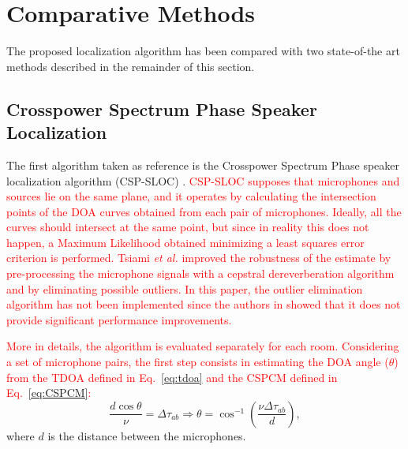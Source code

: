 \documentclass[review]{elsarticle}
\let\originaleqref=\eqref
\renewcommand{\eqref}{Eq.~\originaleqref}
\begin{document}
\section{Comparative Methods}
\label{sec:comp_meth}
The proposed localization algorithm has been compared with two state-of-the art methods described in the remainder of this section.

\subsection{Crosspower Spectrum Phase Speaker Localization}\label{sec:soa_met}
The first algorithm taken as reference is the Crosspower Spectrum Phase speaker localization algorithm (CSP-SLOC) \cite{tsiami2014experiments}. \textcolor{red}{CSP-SLOC supposes that microphones and sources lie on the same plane, and it operates by calculating the intersection points of the DOA curves obtained from each pair of microphones. Ideally, all the curves should intersect at the same point, but since in reality this does not happen, a Maximum Likelihood obtained minimizing a least squares error criterion is performed. Tsiami \textit{et al.} \cite{tsiami2014experiments} improved the robustness of the estimate by pre-processing the microphone signals with a cepstral dereverberation algorithm  and by eliminating possible outliers. In this paper, the outlier elimination algorithm has not been implemented since  the authors in \cite{tsiami2014experiments} showed that it does not provide significant performance improvements.}

\textcolor{red}{More in details, the algorithm is evaluated separately for each room. Considering a set of microphone pairs, the first step consists in 
estimating the DOA angle ($\theta$) from the TDOA defined in \eqref{eq:tdoa} and the CSPCM defined in \eqref{eq:CSPCM}:}
\begin{equation}\label{eq:doa}
\frac{d \cos \theta}{\nu} = \Delta\tau_{ab}  \Rightarrow \theta = \cos^{-1}  \left( \frac{\nu \Delta\tau_{ab} }{d} \right), 
\end{equation}
where $d$ is the distance between the microphones.
\end{document}
